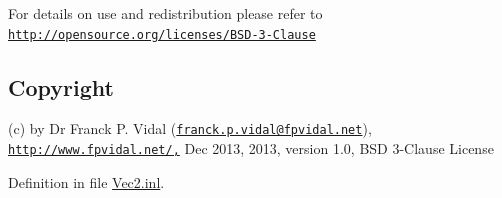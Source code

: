 For details on use and redistribution please refer to \href{http://opensource.org/licenses/BSD-3-Clause}{\tt http://opensource.org/licenses/BSD-\/3-\/Clause}\hypertarget{_x_ray_renderer_8inl_Copyright}{}\subsection{Copyright}\label{_x_ray_renderer_8inl_Copyright}
(c) by Dr Franck P. Vidal (\href{mailto:franck.p.vidal@fpvidal.net}{\tt franck.p.vidal@fpvidal.net}), \href{http://www.fpvidal.net/,}{\tt http://www.fpvidal.net/,} Dec 2013, 2013, version 1.0, BSD 3-\/Clause License 

Definition in file \hyperlink{_vec2_8inl_source}{Vec2.inl}.

